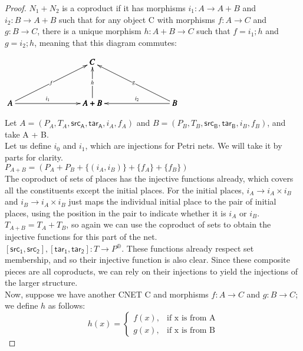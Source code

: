 \begin {proof}
$N_1 + N_2$ is a coproduct if it has morphisms $i_1: A \to A + B$ and $i_2: B \to A + B$ such that for any object C with morphisms $f: A\to C$ and $g: B\to C$, there is a unique morphism $h: A + B \to C$ such that $f = i_1;h$ and $g = i_2; h$, meaning that this diagram commutes:\\
\begin{center}
  \begin{math}
    \bfig
    \Atrianglepair|mmmaa|/<-`<-`<-`->`<-/<1000,500>[
      C`
      A`
      A+B`
      B;
      f`
      h`
      g`
      i_1`
      i_2]
    \efig
  \end{math}
\end{center}
Let $A = (P_A, T_A, \mathsf{src_A}, \mathsf{tar_A}, i_A, f_A)$ and $B = (P_B, T_B, \mathsf{src_B}, \mathsf{tar_B}, i_B, f_B)$, and take A + B.\\
Let us define $i_0$ and $i_1$, which are injections for Petri nets. We will take it by parts for clarity.\\
$P_{A+B} = (P_A +P_B+\{(i_A, i_B)\} +\{f_A\} + \{f_B\})$\\
The coproduct of sets of places has the injective functions already, which covers all the constituents except the initial places. For the initial places, $i_A \to i_A \times i_B$ and $i_B \to i_A \times i_B$ just maps the individual initial place to the pair of initial places, using the position in the pair to indicate whether it is $i_A$ or $i_B$.\\
$T_{A+B} = T_A + T_B$, so again we can use the coproduct of sets to obtain the injective functions for this part of the net.\\
 $[\mathsf{src_1}, \mathsf{src_2}], [\mathsf{tar_1}, \mathsf{tar_2}]: T\to P^\oplus$. These functions already respect set membership, and so their injective function is also clear. Since these composite pieces are all coproducts, we can rely on their injections to yield the injections of the larger structure.\smallskip\\ 
Now, suppose we have another CNET C and morphisms $f: A\to C$ and $g: B\to C$; we define $h$ as follows:\\
  \begin{equation}
    h(x)=
    \begin{cases}
      f(x), & \text{if x is from A}\\
      g(x), & \text{if x is from B}
    \end{cases}
  \end{equation}

\end{proof}

